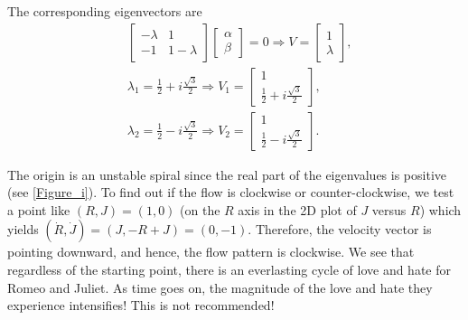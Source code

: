 \documentclass[12pt]{article}
\begin{document}
\begin{ex}
\begin{solution}
\begin{enumerate}[(i)]
  The corresponding eigenvectors are
  \begin{align*}
    &\begin{bmatrix}
      -\lambda & 1\\
      -1 & 1-\lambda
    \end{bmatrix}
    \begin{bmatrix}
      \alpha\\
      \beta
    \end{bmatrix}
    =0\Rightarrow V=
    \begin{bmatrix}
      1\\
      \lambda
    \end{bmatrix},\\
    &\lambda_1=\frac{1}{2}+i\frac{\sqrt{3}}{2}\Rightarrow V_1=\begin{bmatrix}1\\\frac{1}{2}+i\frac{\sqrt{3}}{2}\end{bmatrix},\\
    &\lambda_2=\frac{1}{2}-i\frac{\sqrt{3}}{2}\Rightarrow V_2=\begin{bmatrix}1\\\frac{1}{2}-i\frac{\sqrt{3}}{2}\end{bmatrix}.
  \end{align*}
    
  The origin is an unstable spiral since the real part of the eigenvalues is positive (see \autoref{Figure_i}). To find out if the flow is clockwise or counter-clockwise, we test a point like $(R,J)=(1,0)$ (on the $R$ axis in the 2D plot of $J$ versus $R$) which yields $(\dot{R},\dot{J})=(J,-R+J)=(0,-1)$. Therefore, the velocity vector is pointing downward, and hence, the flow pattern is clockwise. We see that regardless of the starting point, there is an everlasting cycle of love and hate for Romeo and Juliet. As time goes on, the magnitude of the love and hate they experience intensifies! This is not recommended!
    

\end{enumerate}
\end{solution}
\end{ex}
\end{document}
